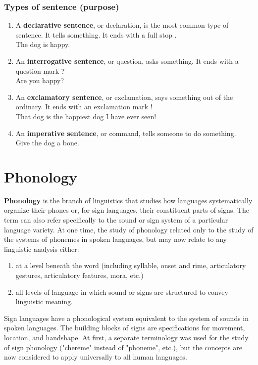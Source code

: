 \subsubsection{Types of sentence (purpose)}
\begin{enumerate}
    \item A \textbf{declarative sentence}, or declaration, is the most common type of sentence. It tells something. It ends with a full stop . \\The dog is happy.
    \item An \textbf{interrogative sentence}, or question, asks something. It ends with a question mark ? \\Are you happy?
    \item An \textbf{exclamatory sentence}, or exclamation, says something out of the ordinary. It ends with an exclamation mark ! \\That dog is the happiest dog I have ever seen!
    \item An \textbf{imperative sentence}, or command, tells someone to do something. \\Give the dog a bone.
\end{enumerate}

\section{Phonology \cite{wiki-phonology}}\label{Language: Phonology}
\textbf{Phonology} is the branch of linguistics that studies how languages systematically organize their phones or, for sign languages, their constituent parts of signs. The term can also refer specifically to the sound or sign system of a particular language variety. At one time, the study of phonology related only to the study of the systems of phonemes in spoken languages, but may now relate to any linguistic analysis either:

\begin{enumerate}
    \item at a level beneath the word (including syllable, onset and rime, articulatory gestures, articulatory features, mora, etc.)
    \item all levels of language in which sound or signs are structured to convey linguistic meaning.
\end{enumerate}

Sign languages have a phonological system equivalent to the system of sounds in spoken languages. The building blocks of signs are specifications for movement, location, and handshape. At first, a separate terminology was used for the study of sign phonology ("chereme" instead of "phoneme", etc.), but the concepts are now considered to apply universally to all human languages.


